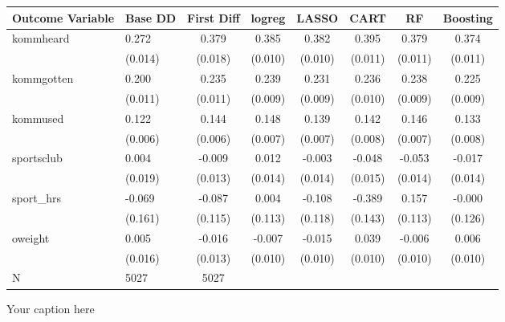\begin{adjustbox}{angle=90}
\begin{tabular}{llcccccc}
\hline
Outcome Variable & Base DD & First Diff & logreg & LASSO & CART & RF & Boosting \\
\hline
kommheard & 0.272 & 0.379 & 0.385 & 0.382 & 0.395 & 0.379 & 0.374 \\
  & (0.014) & (0.018) & (0.010) & (0.010) & (0.011) & (0.011) & (0.011) \\
kommgotten & 0.200 & 0.235 & 0.239 & 0.231 & 0.236 & 0.238 & 0.225 \\
  & (0.011) & (0.011) & (0.009) & (0.009) & (0.010) & (0.009) & (0.009) \\
kommused & 0.122 & 0.144 & 0.148 & 0.139 & 0.142 & 0.146 & 0.133 \\
  & (0.006) & (0.006) & (0.007) & (0.007) & (0.008) & (0.007) & (0.008) \\
sportsclub & 0.004 & -0.009 & 0.012 & -0.003 & -0.048 & -0.053 & -0.017 \\
  & (0.019) & (0.013) & (0.014) & (0.014) & (0.015) & (0.014) & (0.014) \\
sport_hrs & -0.069 & -0.087 & 0.004 & -0.108 & -0.389 & 0.157 & -0.000 \\
  & (0.161) & (0.115) & (0.113) & (0.118) & (0.143) & (0.113) & (0.126) \\
oweight & 0.005 & -0.016 & -0.007 & -0.015 & 0.039 & -0.006 & 0.006 \\
  & (0.016) & (0.013) & (0.010) & (0.010) & (0.010) & (0.010) & (0.010) \\
\hline
N & 5027 & 5027  &  &  &  &  \\
\hline
\end{tabular}
\caption{Your caption here}
\label{tab:your_label}
\end{adjustbox}